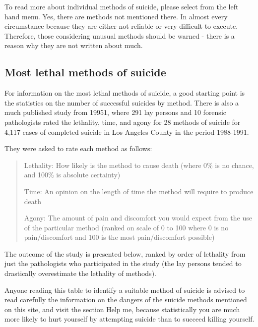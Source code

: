 \documentclass[12pt]{article}
\begin{document}
To read more about individual methods of suicide, please select from the left hand menu. Yes, there are methods not mentioned there. In almost every circumstance because they are either not reliable or very difficult to execute. Therefore, those considering unusual methods should be warned - there is a reason why they are not written about much.

\subsection{Most lethal methods of suicide}

For information on the most lethal methods of suicide, a good starting point is the statistics on the number of successful suicides by method. There is also a much published study from 19951, where 291 lay persons and 10 forensic pathologists rated the lethality, time, and agony for 28 methods of suicide for 4,117 cases of completed suicide in Los Angeles County in the period 1988-1991.

They were asked to rate each method as follows:

\begin{verse}
Lethality: How likely is the method to cause death (where 0\% is no chance, and 100\% is absolute certainty)

Time: An opinion on the length of time the method will require to produce death

Agony: The amount of pain and discomfort you would expect from the use of the particular method (ranked on scale of 0 to 100 where 0 is no pain/discomfort and 100 is the most pain/discomfort possible)
\end{verse}

The outcome of the study is presented below, ranked by order of lethality from just the pathologists who participated in the study (the lay persons tended to drastically overestimate the lethality of methods).

Anyone reading this table to identify a suitable method of suicide is advised to read carefully the information on the dangers of the suicide methods mentioned on this site, and visit the section Help me, because statistically you are much more likely to hurt yourself by attempting suicide than to succeed killing yourself.
\end{document}
